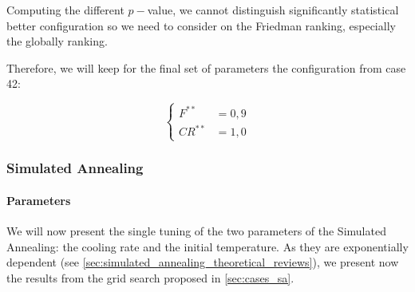 \documentclass[12pt, openany]{article}
\begin{document}
Computing the different $p-$value, we cannot distinguish significantly statistical better configuration so we need to consider on the Friedman ranking, especially the globally ranking.

\begin{table}[H]
    \centering
    \renewcommand{\arraystretch}{1.3}
    \caption{\textbf{Summary of statistical significance tests for the F and CR parameter combinations.} The Critical Difference (CD) dictates the threshold for Nemenyi pairwise significance. No significant differences were detected overall ($p \ge 0.05$).}
    \label{tab:statistical_tests_F_CR}
\end{table}

Therefore, we will keep for the final set of parameters the configuration from case 42:

$$
\boxed{
\begin{cases}
    F^{**} &= 0,9\\
    CR^{**} &= 1,0    
\end{cases}
}
$$

\subsubsection{Simulated Annealing}\label{sec:simulated_annealing_parameters}

\paragraph{Parameters} We will now present the single tuning of the two parameters of the Simulated Annealing: the cooling rate and the initial temperature. As they are exponentially dependent (see \ref{sec:simulated_annealing_theoretical_reviews}), we present now the results from the grid search proposed in \ref{sec:cases_sa}.
\end{document}
